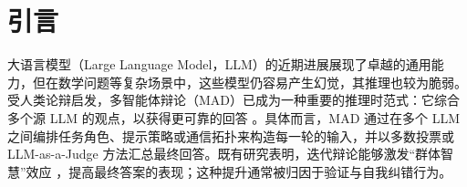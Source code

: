 \documentclass{article}
\theoremstyle{plain}
\theoremstyle{definition}
\theoremstyle{remark}
\begin{document}


\begin{abstract}
  多智能体辩论（Multi-Agent Debate，MAD）在提升推理能力和减少幻觉方面展现出潜力，但信息交换究竟如何塑造单个智能体的推理行为仍不清楚。从经验上看，MAD 呈现出一些看似矛盾的现象，包括准确率随词元熵一同上升，以及同构与异构智能体组合之间存在显著差异。本文提出一个面向 MAD 的贝叶斯不确定性分析框架，将答案层面的预测不确定性分解为认知不确定性和偶然不确定性，二者分别对应辩论的潜在收益与成本。对多种智能体配置的研究表明，有效辩论取决于在控制偶然成本的同时获得较高的认知增益。基于这一认识，我们设计了一种不确定性引导的多智能体强化学习算法，以降低偶然成本并更有效地利用认知信息。实验表明，该方法既能提高每个智能体的准确率，也能促进更富成效的辩论过程，从而为理解和改进 MAD 提供一种可操作的贝叶斯视角。
\end{abstract}



\section{引言}



大语言模型（Large Language Model，LLM）的近期进展展现了卓越的通用能力，但在数学问题等复杂场景中，这些模型仍容易产生幻觉，其推理也较为脆弱。受人类论辩启发，多智能体辩论（MAD）已成为一种重要的推理时范式：它综合多个源 LLM 的观点，以获得更可靠的回答 \cite{du2023improving}。具体而言，MAD 通过在多个 LLM 之间编排任务角色、提示策略或通信拓扑来构造每一轮的输入，并以多数投票或 LLM-as-a-Judge 方法汇总最终回答。既有研究表明，迭代辩论能够激发“群体智慧”效应 \cite{minsky1986society}，提高最终答案的表现；这种提升通常被归因于验证与自我纠错行为。
\end{document}
